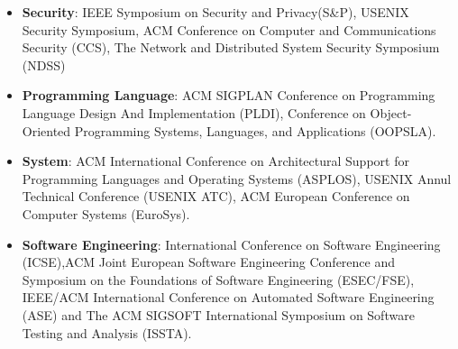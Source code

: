 \begin{itemize}
  \item \textbf{Security}: IEEE Symposium on Security and Privacy(S\&P),
  USENIX Security Symposium, ACM Conference on Computer and Communications
  Security (CCS), The Network and Distributed System Security Symposium (NDSS)
  \item \textbf{Programming Language}: ACM SIGPLAN Conference on Programming
  Language Design And Implementation (PLDI), Conference on Object-Oriented
  Programming Systems, Languages, and Applications (OOPSLA).
  \item \textbf{System}: ACM International Conference on Architectural Support
  for Programming Languages and Operating Systems (ASPLOS), USENIX Annul
  Technical Conference (USENIX ATC), ACM European Conference on Computer
  Systems (EuroSys).
  \item \textbf{Software Engineering}: International Conference on Software
  Engineering (ICSE),ACM Joint European Software Engineering Conference and
  Symposium on the Foundations of Software Engineering (ESEC/FSE), IEEE/ACM
  International Conference on Automated Software Engineering (ASE) and The ACM
  SIGSOFT International Symposium on Software Testing and Analysis (ISSTA).
\end{itemize}


\newpage
